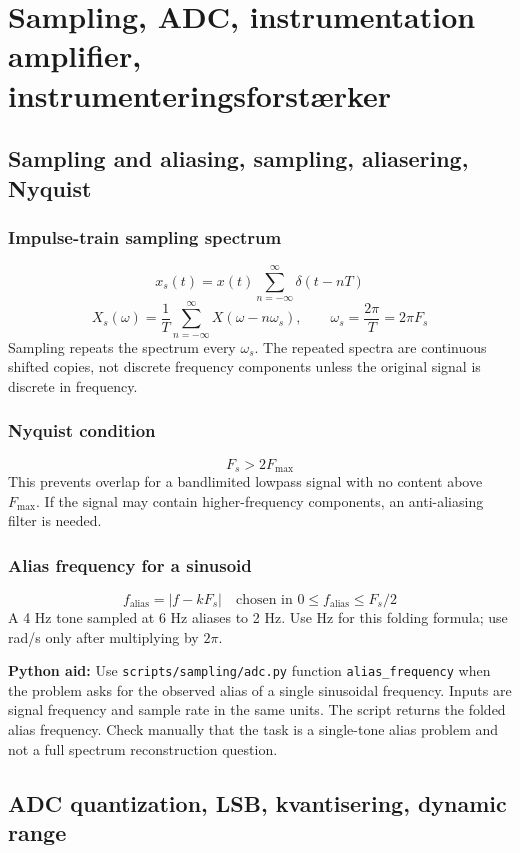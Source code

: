 \section{Sampling, ADC, instrumentation amplifier, instrumenteringsforstærker}

\subsection{Sampling and aliasing, sampling, aliasering, Nyquist}

\subsubsection{Impulse-train sampling spectrum}
\[
x_s(t)=x(t)\sum_{n=-\infty}^{\infty}\delta(t-nT)
\]
\[
X_s(\omega)=\frac{1}{T}\sum_{n=-\infty}^{\infty}X(\omega-n\omega_s),\qquad
\omega_s=\frac{2\pi}{T}=2\pi F_s
\]
Sampling repeats the spectrum every \(\omega_s\). The repeated spectra are continuous shifted copies, not discrete frequency components unless the original signal is discrete in frequency.

\subsubsection{Nyquist condition}
\[
F_s>2F_{\max}
\]
This prevents overlap for a bandlimited lowpass signal with no content above \(F_{\max}\). If the signal may contain higher-frequency components, an anti-aliasing filter is needed.

\subsubsection{Alias frequency for a sinusoid}
\[
f_{\mathrm{alias}}=\left|f-kF_s\right|\quad\text{chosen in }0\leq f_{\mathrm{alias}}\leq F_s/2
\]
A 4 Hz tone sampled at 6 Hz aliases to 2 Hz. Use Hz for this folding formula; use rad/s only after multiplying by \(2\pi\).

\textbf{Python aid:} Use \texttt{scripts/sampling/adc.py} function \texttt{alias\_frequency} when the problem asks for the observed alias of a single sinusoidal frequency. Inputs are signal frequency and sample rate in the same units. The script returns the folded alias frequency. Check manually that the task is a single-tone alias problem and not a full spectrum reconstruction question.

\subsection{ADC quantization, LSB, kvantisering, dynamic range}

